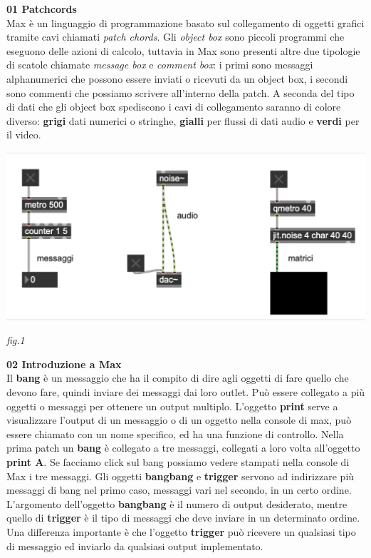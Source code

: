 \documentclass[11pt]{article}
\begin{document}
\begin{multicols*}{2}
\parskip=0pt

\textbf{\textsf {01 Patchcords}}\\

\noindent Max è un linguaggio di programmazione basato sul collegamento di oggetti grafici tramite cavi chiamati \textit {patch chords}. Gli \textit{object box} sono piccoli programmi che eseguono delle azioni di calcolo, tuttavia in Max sono presenti altre due tipologie di scatole chiamate \textit{message box} e \textit{comment box}: i primi sono messaggi alphanumerici che possono essere inviati o ricevuti da un object box, i secondi sono commenti che possiamo scrivere all’interno della patch.
A seconda del tipo di dati che gli object box spediscono i cavi di collegamento saranno di colore diverso: \textbf{grigi} dati numerici o stringhe, \textbf{gialli} per flussi di dati audio e \textbf{verdi} per il video.\\

\begin{center}
\includegraphics[scale=0.3]{images/01patchcords.png}

{\scriptsize \emph{fig.1 }}
\end{center}

\textbf{\textsf {02 Introduzione a Max}}\\

\noindent Il \textbf{bang} è un messaggio che ha il compito di dire agli oggetti di fare quello che devono fare, quindi inviare dei messaggi dai loro outlet. Può essere collegato a più oggetti o messaggi per ottenere un output multiplo.
L’oggetto \textbf{print} serve a visualizzare l’output di un messaggio o di un oggetto nella console di max, può essere chiamato con un nome specifico, ed ha una funzione di controllo.
Nella prima patch un \textbf{bang} è collegato a tre messaggi, collegati a loro volta all’oggetto \textbf{print A}. Se facciamo click sul bang possiamo vedere stampati nella console di Max i tre messaggi.
Gli oggetti \textbf{bangbang} e \textbf{trigger} servono ad indirizzare più messaggi di bang nel primo caso, messaggi vari nel secondo, in un certo ordine. L’argomento dell’oggetto \textbf{bangbang} è il numero di output desiderato, mentre quello di \textbf{trigger} è il tipo di messaggi che deve inviare in un determinato ordine. Una differenza importante è che l’oggetto \textbf{trigger} può ricevere un qualsiasi tipo di messaggio ed inviarlo da qualsiasi output implementato.\\


\end{multicols*}
\end{document}
